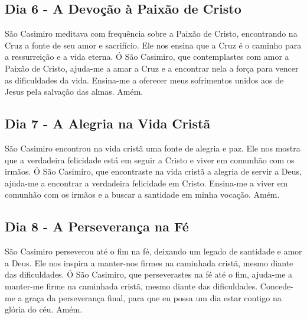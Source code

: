 \documentclass[a4paper,14pt]{extarticle} \usepackage[utf8]{inputenc}
\begin{document}
\underline{}


\subsection{Dia 6 - A Devoção à Paixão de Cristo}


\underline{}

São Casimiro meditava com frequência sobre a Paixão de Cristo, encontrando na Cruz a fonte de seu amor e sacrifício. Ele nos ensina que a Cruz é o caminho para a ressurreição e a vida eterna.
Ó São Casimiro, que contemplastes com amor a Paixão de Cristo, ajuda-me a amar a Cruz e a encontrar nela a força para vencer as dificuldades da vida. Ensina-me a oferecer meus sofrimentos unidos aos de Jesus pela salvação das almas. Amém.


\underline{}


\subsection{Dia 7 - A Alegria na Vida Cristã}


\underline{}

São Casimiro encontrou na vida cristã uma fonte de alegria e paz. Ele nos mostra que a verdadeira felicidade está em seguir a Cristo e viver em comunhão com os irmãos.
Ó São Casimiro, que encontraste na vida cristã a alegria de servir a Deus, ajuda-me a encontrar a verdadeira felicidade em Cristo. Ensina-me a viver em comunhão com os irmãos e a buscar a santidade em minha vocação. Amém.


\underline{}

\subsection{Dia 8 - A Perseverança na Fé}


\underline{}

São Casimiro perseverou até o fim na fé, deixando um legado de santidade e amor a Deus. Ele nos inspira a manter-nos firmes na caminhada cristã, mesmo diante das dificuldades.
Ó São Casimiro, que perseverastes na fé até o fim, ajuda-me a manter-me firme na caminhada cristã, mesmo diante das dificuldades. Concede-me a graça da perseverança final, para que eu possa um dia estar contigo na glória do céu. Amém.


\underline{}
\end{document}
